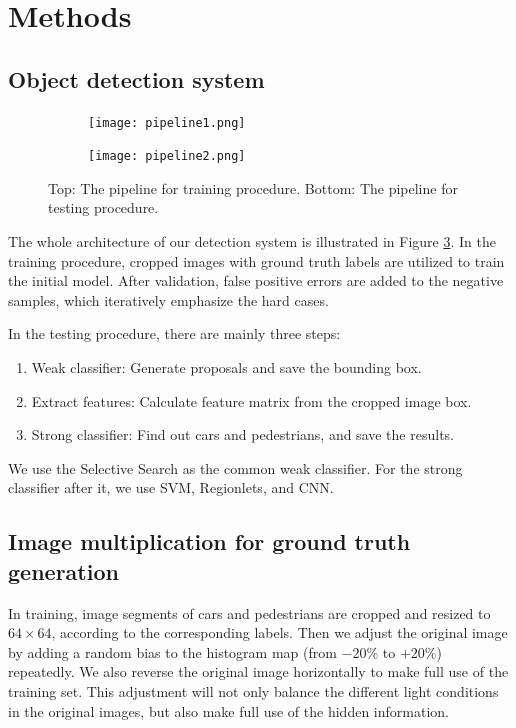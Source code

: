 \documentclass{article} %
\begin{document}
\section{Methods}

\subsection{Object detection system}


\begin{figure}[htb]
\begin{subfigure}[b]{0.9\textwidth}
    \centering
    \texttt{[image: pipeline1.png]}
    \label{fig:pipeline1}
\end{subfigure}
\begin{subfigure}[b]{0.9\textwidth}
    \centering
    \texttt{[image: pipeline2.png]}
    \label{fig:pipeline2}
\end{subfigure}
\caption{Top: The pipeline for training procedure. Bottom: The pipeline for testing procedure.
\label{fig:pipeline}}
\end{figure}


The whole architecture of our detection system is illustrated in Figure \ref{fig:pipeline}. In the training procedure, cropped images with ground truth labels are utilized to train the initial model. After validation, false positive errors are added to the negative samples, which iteratively emphasize the hard cases. 

In the testing procedure, there are mainly three steps: 
\begin{enumerate}[Step 1]
    \item Weak classifier: Generate proposals and save the bounding box.
    \item Extract features: Calculate feature matrix from the cropped image box.
    \item Strong classifier: Find out cars and pedestrians, and save the results.
\end{enumerate}

We use the Selective Search \cite{van2011segmentation} as the common weak classifier. For the strong classifier after it, we use SVM, Regionlets, and CNN.

\subsection{Image multiplication for ground truth generation}
\label{sec:positive}

In training, image segments of cars and pedestrians are cropped and resized to $64 \times 64$, according to the corresponding labels. Then we adjust the original image by adding a random bias to the histogram map (from $-20\%$ to $+20\%$) repeatedly. We also reverse the original image horizontally to make full use of the training set. This adjustment will not only balance the different light conditions in the original images, but also make full use of the hidden information. 
\end{document}

